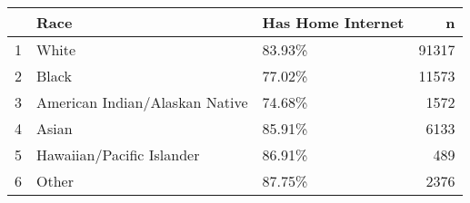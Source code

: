 \begin{table}[ht]
\centering
\begin{tabular}{rllr}
  \hline
 & Race & Has Home Internet & n \\ 
  \hline
1 & White & 83.93\% & 91317 \\ 
  2 & Black & 77.02\% & 11573 \\ 
  3 & American Indian/Alaskan Native & 74.68\% & 1572 \\ 
  4 & Asian & 85.91\% & 6133 \\ 
  5 & Hawaiian/Pacific Islander & 86.91\% & 489 \\ 
  6 & Other & 87.75\% & 2376 \\ 
   \hline
\end{tabular}
\end{table}

